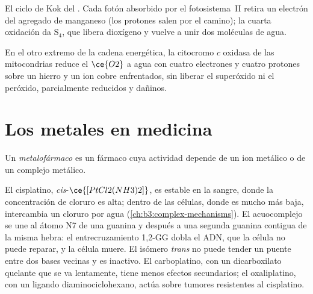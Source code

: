 \begin{omfigure}

{\small El ciclo de Kok del . Cada fotón absorbido por el
fotosistema~II retira un electrón del agregado de manganeso (los protones
salen por el camino); la cuarta oxidación da $\mathrm S_4$, que libera dioxígeno y
vuelve a unir dos moléculas de agua.}
\end{omfigure}

En el otro extremo de la cadena energética, la citocromo $c$ oxidasa de las
mitocondrias reduce el $\ce{O2}$ a agua con cuatro electrones y cuatro protones sobre un
hierro  y un ion cobre enfrentados, sin liberar el superóxido ni el peróxido,
parcialmente reducidos y dañinos.

\section{Los metales en medicina}

\begin{definition}[Metalofármacos]\label{def:b3:bioinorganic:metallodrug}
Un \emph{metalofármaco} es un fármaco cuya actividad depende de un
ion metálico o de un complejo metálico.
\end{definition}

El cisplatino, \textit{cis}-$\ce{[PtCl2(NH3)2]}$, es estable en la sangre, donde la concentración de cloruro es
alta; dentro de las células, donde es mucho más baja, intercambia un cloruro por agua
(\cref{ch:b3:complex-mechanisms}). El acuocomplejo se une al átomo N7 de una
guanina y después a una segunda guanina contigua de la misma hebra: el entrecruzamiento 1,2-GG
dobla el ADN, que la célula no puede reparar, y la célula muere. El
isómero \textit{trans} no puede tender un puente entre dos bases vecinas y es inactivo.
El carboplatino, con un dicarboxilato quelante que se va lentamente, tiene menos
efectos secundarios; el oxaliplatino, con un ligando diaminociclohexano, actúa sobre tumores
resistentes al cisplatino.

